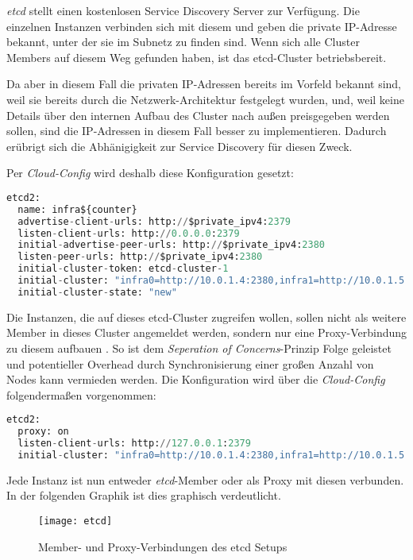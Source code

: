 \emph{etcd} stellt einen kostenlosen Service Discovery Server zur Verfügung.
Die einzelnen Instanzen verbinden sich mit diesem und geben die private
IP-Adresse bekannt, unter der sie im Subnetz zu finden sind. Wenn sich alle
Cluster Members auf diesem Weg gefunden haben, ist das etcd-Cluster
betriebsbereit.

Da aber in diesem Fall die privaten IP-Adressen bereits im Vorfeld bekannt sind,
weil sie bereits
durch die Netzwerk-Architektur festgelegt wurden, und, weil keine Details
über den internen Aufbau des Cluster nach außen preisgegeben werden sollen,
sind die IP-Adressen in diesem Fall besser  zu implementieren.
Dadurch erübrigt sich die Abhänigigkeit zur Service Discovery für diesen Zweck.

Per \emph{Cloud-Config} wird deshalb diese Konfiguration gesetzt:

\begin{lstlisting}[language=Python,numbers=none]
etcd2:
  name: infra${counter}
  advertise-client-urls: http://$private_ipv4:2379
  listen-client-urls: http://0.0.0.0:2379
  initial-advertise-peer-urls: http://$private_ipv4:2380
  listen-peer-urls: http://$private_ipv4:2380
  initial-cluster-token: etcd-cluster-1
  initial-cluster: "infra0=http://10.0.1.4:2380,infra1=http://10.0.1.5:2380,infra2=http://10.0.1.6:2380"
  initial-cluster-state: "new"\end{lstlisting}

Die Instanzen, die auf dieses etcd-Cluster zugreifen wollen, sollen nicht als
weitere Member in dieses Cluster angemeldet werden, sondern nur eine
Proxy-Verbindung
zu diesem aufbauen \cite{CoreOSCluster}.
So ist dem \emph{Seperation of Concerns}-Prinzip Folge geleistet und potentieller
Overhead
durch Synchronisierung einer großen Anzahl von Nodes kann vermieden werden.
Die Konfiguration wird über die \emph{Cloud-Config} folgendermaßen vorgenommen:

\begin{lstlisting}[language=Python,numbers=none]
etcd2:
  proxy: on
  listen-client-urls: http://127.0.0.1:2379
  initial-cluster: "infra0=http://10.0.1.4:2380,infra1=http://10.0.1.5:2380,infra2=http://10.0.1.6:2380"\end{lstlisting}

Jede Instanz ist nun entweder \emph{etcd}-Member oder als Proxy mit diesen
verbunden.
In der folgenden Graphik ist dies graphisch verdeutlicht.

\begin{figure}[H]
\centering
\texttt{[image: etcd]}
\caption{Member- und Proxy-Verbindungen des etcd Setups}
\end{figure}

